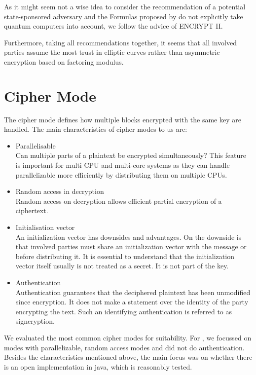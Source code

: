 As it might seem not a wise idea to consider the recommendation of a potential state-sponsored adversary and the Formulas proposed by \citeauthor{Lenstra04keylength.} do not explicitly take quantum computers into account, we follow the advice of ENCRYPT II.

Furthermore, taking all recommendations together, it seems that all involved parties assume the most trust in elliptic curves rather than asymmetric encryption based on factoring modulus.

\section{Cipher Mode}
The cipher mode defines how multiple blocks encrypted with the same key are handled. The main characteristics of cipher modes to us are:
\begin{itemize}
	\item Parallelisable\\ 
	Can multiple parts of a plaintext be encrypted simultaneously? This feature is important for multi CPU and multi-core systems as they can handle parallelizable more efficiently by distributing them on multiple CPUs.
	\item Random access in decryption\\
	Random access on decryption allows efficient partial encryption of a ciphertext.
	\item Initialisation vector\\
	An initialization vector has downsides and advantages. On the downside is that involved parties must share an initialization vector with the message or before distributing it. It is essential to understand that the initialization vector itself usually is not treated as a secret. It is not part of the key.
	\item Authentication\\
	Authentication guarantees that the deciphered plaintext has been unmodified since encryption. It does not make a statement over the identity of the party encrypting the text. Such an identifying authentication is referred to as signcryption.
\end{itemize}

We evaluated the most common cipher modes for suitability. For \MessageVortex, we focussed on modes with parallelizable, random access modes and did not do authentication. Besides the characteristics mentioned above, the main focus was on whether there is an open implementation in java, which is reasonably tested.

